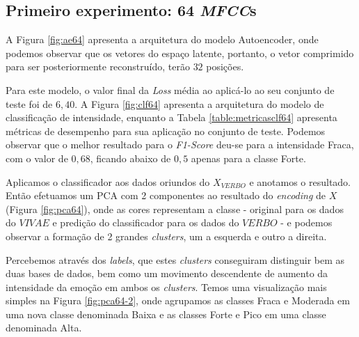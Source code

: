 \subsection{Primeiro experimento: 64 \textit{MFCC}s}

A Figura \ref{fig:ae64} apresenta a arquitetura do modelo Autoencoder, onde podemos observar que os vetores do espaço latente, portanto, o vetor comprimido para ser posteriormente reconstruído, terão $32$ posições.

Para este modelo, o valor final da \textit{Loss} média ao aplicá-lo ao seu conjunto de teste foi de $6,40$. 
A Figura \ref{fig:clf64} apresenta a arquitetura do modelo de classificação de intensidade, enquanto a Tabela \ref{table:metricasclf64} apresenta métricas de desempenho para sua aplicação no conjunto de teste. Podemos observar que o melhor resultado para o \textit{F1-Score} deu-se para a intensidade Fraca, com o valor de $0,68$, ficando abaixo de $0,5$ apenas para a classe Forte.

Aplicamos o classificador aos dados oriundos do $X_{VERBO}$ e anotamos o resultado. Então efetuamos um \acrshort{PCA} com 2 componentes ao resultado do \textit{encoding} de $X$ (Figura \ref{fig:pca64}), onde as cores representam a classe - original para os dados do $VIVAE$ e predição do classificador para os dados do $VERBO$ - e podemos observar a formação de 2 grandes \textit{clusters}, um a esquerda e outro a direita.

Percebemos através dos \textit{labels}, que estes \textit{clusters} conseguiram distinguir bem as duas bases de dados, bem como um movimento descendente de aumento da intensidade da emoção em ambos os \textit{clusters}. Temos uma visualização mais simples na Figura \ref{fig:pca64-2}, onde agrupamos as classes Fraca e Moderada em uma nova classe denominada Baixa e as classes Forte e Pico em uma classe denominada Alta.


